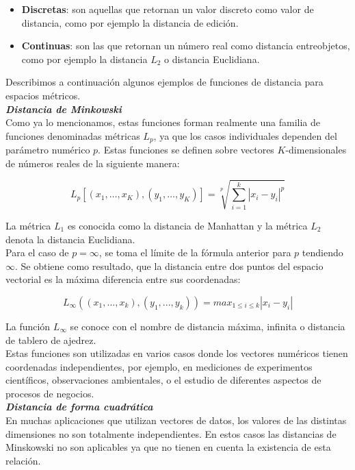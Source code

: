 \begin{itemize}
\item \textbf{Discretas}: son  aquellas que retornan un valor discreto como valor de distancia, como por ejemplo la distancia de edici\'on.
\item \textbf{Continuas}: son las que retornan un n\'umero real como distancia entreobjetos, como por ejemplo la distancia $L_2$ o distancia Euclidiana.
\end{itemize}

Describimos a continuaci\'on algunos ejemplos de funciones de distancia para espacios m\'etricos. \\

\noindent \textbf{\textit{Distancia de Minkowski}} \\

Como ya lo mencionamos, estas funciones forman realmente una familia de funciones denominadas m\'etricas $L_p$, ya que los casos individuales dependen del par\'ametro num\'erico $p$. Estas funciones se definen sobre vectores $K$-dimensionales de n\'umeros reales de la siguiente manera:

\[
L_p[(x_1,\ldots,x_K),(y_1,\ldots,y_K)] = \sqrt[p]{ \sum_{i=1}^k|x_i - y_i|^p}
\]

La m\'etrica $L_1$ es conocida como la distancia de Manhattan y la m\'etrica $L_2$ denota la distancia Euclidiana.\\

Para el caso de $p=\infty$, se toma el l\'imite de la f\'ormula anterior para $p$ tendiendo $\infty$. Se obtiene como resultado, que la distancia entre dos puntos del espacio vectorial es la m\'axima diferencia entre sus coordenadas:

\[
L_{\infty}((x_1,...,x_k), (y_1,...,y_k)) = max_{1 \leq i \leq k} |x_i - y_i |
\]

La funci\'on $L_{\infty}$ se conoce con el nombre de  distancia m\'axima, infinita o distancia de tablero de ajedrez.\\

Estas funciones son utilizadas en varios casos donde los vectores num\'ericos tienen coordenadas independientes, por ejemplo, en mediciones de experimentos cient\'ificos, observaciones ambientales, o el estudio de diferentes aspectos de procesos de negocios.\\

\noindent \textbf{\textit{Distancia de  forma cuadr\'atica}}\\

En muchas aplicaciones que utilizan vectores de datos, los valores de las distintas dimensiones no son totalmente independientes. En estos casos las distancias de Minskowski no son aplicables ya que no tienen en cuenta la existencia de esta relaci\'on.\\

